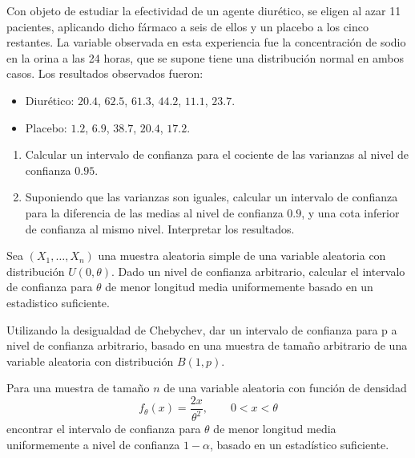 \begin{ejercicio}
    Con objeto de estudiar la efectividad de un agente diurético, se eligen al azar 11 pacientes, aplicando dicho fármaco a seis de ellos y un placebo a los cinco restantes. La variable observada en esta experiencia fue la concentración de sodio en la orina a las 24 horas, que se supone tiene una distribución normal en ambos casos. Los resultados observados fueron:
    \begin{itemize}
        \item Diurético: $20.4$, $62.5$, $61.3$, $44.2$, $11.1$, $23.7$.
        \item Placebo: $1.2$, $6.9$, $38.7$, $20.4$, $17.2$.
    \end{itemize}
    \begin{enumerate}[label=\alph*)]
        \item Calcular un intervalo de confianza para el cociente de las varianzas al nivel de confianza $0.95$.
        \item Suponiendo que las varianzas son iguales, calcular un intervalo de confianza para la diferencia de las medias al nivel de confianza $0.9$, y una cota inferior de confianza al mismo nivel. Interpretar los resultados.
    \end{enumerate}
\end{ejercicio}

\begin{ejercicio}
    Sea $(X_1, \ldots, X_n)$ una muestra aleatoria simple de una variable aleatoria con distribución $U(0,\theta)$. Dado un nivel de confianza arbitrario, calcular el intervalo de confianza para $\theta$ de menor longitud media uniformemente basado en un estadistico suficiente.
\end{ejercicio}

\begin{ejercicio}
    Utilizando la desigualdad de Chebychev, dar un intervalo de confianza para p a nivel de confianza arbitrario, basado en una muestra de tamaño arbitrario de una variable aleatoria con distribución $B(1,p)$.
\end{ejercicio}

\begin{ejercicio}
    Para una muestra de tamaño $n$ de una variable aleatoria con función de densidad
    \begin{equation*}
        f_\theta(x) = \frac{2x}{\theta^2}, \qquad 0<x<\theta
    \end{equation*}
    encontrar el intervalo de confianza para $\theta$ de menor longitud media uniformemente a nivel de confianza $1-\alpha$, basado en un estadístico suficiente.
\end{ejercicio}

